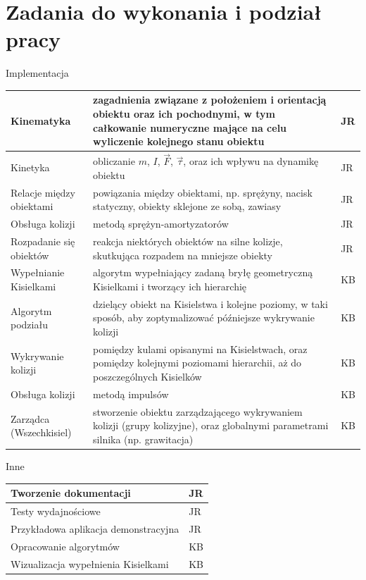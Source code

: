 \section{Zadania do wykonania i podział pracy}
\begin{center}
	Implementacja
	\begin{longtable}{|p{30mm}|p{85mm}|p{8mm}|} \hline
	Kinematyka & zagadnienia związane z położeniem i orientacją obiektu oraz
	ich pochodnymi, w tym całkowanie numeryczne mające na celu wyliczenie
	kolejnego stanu obiektu & JR \\ \hline
	
	Kinetyka & obliczanie $m$, $I$, $\vec{F}$, $\vec{\tau}$, oraz ich wpływu na
	dynamikę obiektu & JR \\ \hline
	
	Relacje między obiektami & powiązania między obiektami, np. sprężyny, nacisk
	statyczny, obiekty sklejone ze sobą, zawiasy & JR \\ \hline
	
    Obsługa kolizji & metodą sprężyn-amortyzatorów & JR \\ \hline
    
    Rozpadanie się obiektów & reakcja niektórych obiektów na silne kolizje,
    skutkująca rozpadem na mniejsze obiekty & JR \\ \hline \hline
    
    Wypełnianie Kisielkami & algorytm wypełniający zadaną bryłę geometryczną
    Kisielkami i tworzący ich hierarchię & KB
    \\ \hline
    
    Algorytm podziału & dzielący obiekt na Kisielstwa i kolejne poziomy, w taki
    sposób, aby zoptymalizować późniejsze wykrywanie kolizji & KB
    \\ \hline
    
    Wykrywanie kolizji & pomiędzy kulami opisanymi na Kisielstwach, oraz
    pomiędzy kolejnymi poziomami hierarchii, aż do poszczególnych Kisielków & KB \\ \hline
    
    Obsługa kolizji & metodą impulsów & KB \\ \hline
    
    Zarządca (Wszechkisiel) & stworzenie obiektu zarządzającego wykrywaniem
    kolizji (grupy kolizyjne), oraz globalnymi parametrami silnika (np. grawitacja) & KB
    \\ \hline
    
	\end{longtable}
    
    Inne
	\begin{longtable}{|p{120mm}|p{8mm}|} \hline
    Tworzenie dokumentacji & JR \\ \hline
    Testy wydajnościowe & JR \\ \hline
    Przykładowa aplikacja demonstracyjna & JR \\ \hline \hline
    Opracowanie algorytmów & KB \\ \hline
    Wizualizacja wypełnienia Kisielkami & KB \\ \hline
	\end{longtable}
\end{center}


